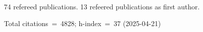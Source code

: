 74 refereed publications. 13 refeered publications as first author.

Total citations~=~4828; h-index~=~37 (2025-04-21)